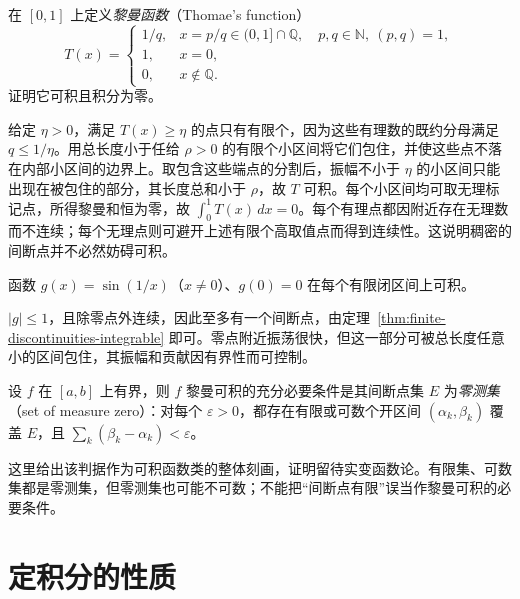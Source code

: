 \begin{example}
\label{ex:thomae-function-riemann-integrable}
在 $[0,1]$ 上定义\emph{黎曼函数}（Thomae's function）
\[
    T(x)=
    \begin{cases}
        1/q,&x=p/q\in(0,1]\cap\mathbb Q,\quad p,q\in\mathbb N,\ (p,q)=1,\\
        1,&x=0,\\
        0,&x\notin\mathbb Q.
    \end{cases}
\]
证明它可积且积分为零。
\end{example}
\begin{solve}
给定 $\eta>0$，满足 $T(x)\geq\eta$ 的点只有有限个，因为这些有理数的既约分母满足 $q\leq1/\eta$。用总长度小于任给 $\rho>0$ 的有限个小区间将它们包住，并使这些点不落在内部小区间的边界上。取包含这些端点的分割后，振幅不小于 $\eta$ 的小区间只能出现在被包住的部分，其长度总和小于 $\rho$，故 $T$ 可积。每个小区间均可取无理标记点，所得黎曼和恒为零，故 $\int_0^1T(x)\,dx=0$。每个有理点都因附近存在无理数而不连续；每个无理点则可避开上述有限个高取值点而得到连续性。这说明稠密的间断点并不必然妨碍可积。
\end{solve}

\begin{example}
\label{ex:oscillatory-sine-riemann-integrable}
函数 $g(x)=\sin(1/x)$（$x\neq0$）、$g(0)=0$ 在每个有限闭区间上可积。
\end{example}
\begin{solve}
$|g|\leq1$，且除零点外连续，因此至多有一个间断点，由定理~\ref{thm:finite-discontinuities-integrable} 即可。零点附近振荡很快，但这一部分可被总长度任意小的区间包住，其振幅和贡献因有界性而可控制。
\end{solve}

\begin{theorem}[勒贝格可积性判据]
\label{thm:lebesgue-criterion-riemann-integrability}
设 $f$ 在 $[a,b]$ 上有界，则 $f$ 黎曼可积的充分必要条件是其间断点集 $E$ 为\emph{零测集}（set of measure zero）：对每个 $\varepsilon>0$，都存在有限或可数个开区间 $(\alpha_k,\beta_k)$ 覆盖 $E$，且 $\sum_k(\beta_k-\alpha_k)<\varepsilon$。
\end{theorem}

这里给出该判据作为可积函数类的整体刻画，证明留待实变函数论。有限集、可数集都是零测集，但零测集也可能不可数；不能把“间断点有限”误当作黎曼可积的必要条件。

\section{定积分的性质}
\label{sec:properties-of-definite-integrals}

